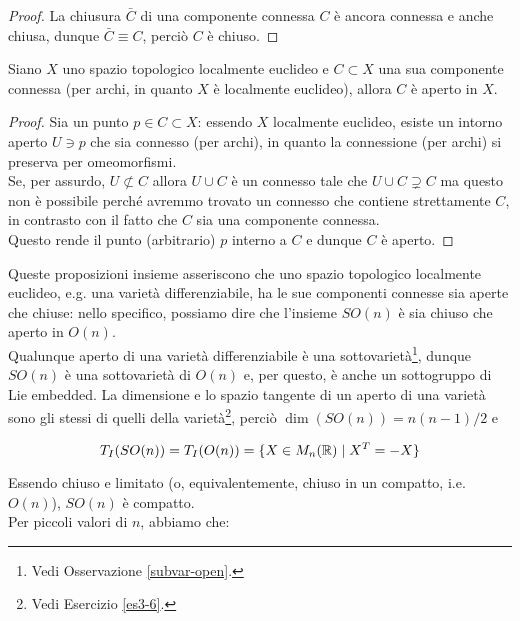 \begin{proof}
	La chiusura $ \bar{C} $ di una componente connessa $ C $ è ancora connessa e anche chiusa, dunque $ \bar{C} \equiv C $, perciò $ C $ è chiuso.
\end{proof}

\begin{definition}
	Siano $ X $ uno spazio topologico localmente euclideo e $ C \subset X $ una sua componente connessa (per archi, in quanto $ X $ è localmente euclideo), allora $ C $ è aperto in $ X $.
\end{definition}

\begin{proof}
	Sia un punto $ p \in C \subset X $: essendo $ X $ localmente euclideo, esiste un intorno aperto $ U \ni p $ che sia connesso (per archi), in quanto la connessione (per archi) si preserva per omeomorfismi.\\
	Se, per assurdo, $ U \not\subset C $ allora $ U \cup C $ è un connesso tale che $ U \cup C \supsetneq C $ ma questo non è possibile perché avremmo trovato un connesso che contiene strettamente $ C $, in contrasto con il fatto che $ C $ sia una componente connessa.\\
	Questo rende il punto (arbitrario) $ p $ interno a $ C $ e dunque $ C $ è aperto.
\end{proof}

Queste proposizioni insieme asseriscono che uno spazio topologico localmente euclideo, e.g. una varietà differenziabile, ha le sue componenti connesse sia aperte che chiuse: nello specifico, possiamo dire che l'insieme $ SO(n) $ è sia chiuso che aperto in $ O(n) $.\\
Qualunque aperto di una varietà differenziabile è una sottovarietà\footnote{%
	Vedi Osservazione \ref{subvar-open}.%
}, dunque $ SO(n) $ è una sottovarietà di $ O(n) $ e, per questo, è anche un sottogruppo di Lie embedded. La dimensione e lo spazio tangente di un aperto di una varietà sono gli stessi di quelli della varietà\footnote{%
	Vedi Esercizio \ref{es3-6}.%
}, perciò $ \dim(SO(n)) = n(n-1)/2 $ e

\begin{equation}
	T_{I}(SO(n)) = T_{I}(O(n)) = \{ X \in M_{n}(\mathbb{R}) \mid X^{T} = -X \}
\end{equation}

Essendo chiuso e limitato (o, equivalentemente, chiuso in un compatto, i.e. $ O(n) $), $ SO(n) $ è compatto.\\
Per piccoli valori di $ n $, abbiamo che:

